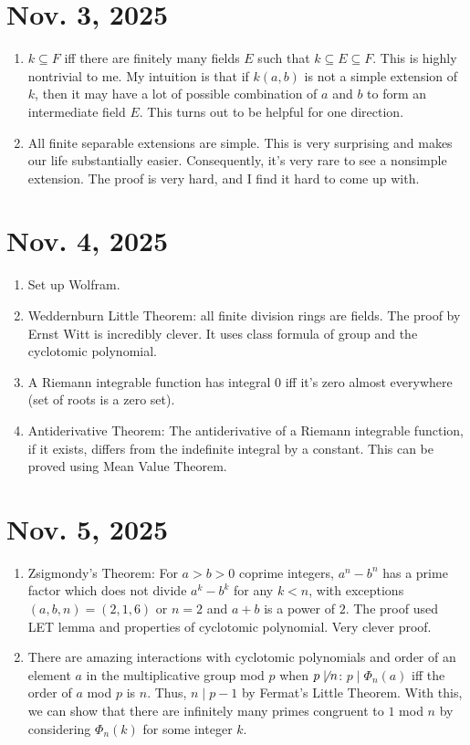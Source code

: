 \documentclass[15pt]{scrartcl}
\begin{document}
\section{Nov. 3, 2025}
\begin{enumerate}
\item $k\subseteq F$ iff there are finitely many fields $E$ such that $k\subseteq E\subseteq F$. 
This is highly nontrivial to me. My intuition is that if $k(a,b)$ is not a simple extension of $k$, then it may have a lot of possible combination of $a$ and $b$ to form an intermediate field $E$. This turns out to be helpful for one direction. 
\item All finite separable extensions are simple. This is very surprising and makes our life substantially easier. Consequently, it's very rare to see a nonsimple extension. The proof is very hard, and I find it hard to come up with. 
\end{enumerate}
\section{Nov. 4, 2025}
\begin{enumerate}
\item Set up Wolfram. 
\item Weddernburn Little Theorem: all finite division rings are fields. The proof by Ernst Witt is incredibly clever. It uses class formula of group and the cyclotomic polynomial.
\item A Riemann integrable function has integral $0$ iff it's zero almost everywhere (set of roots is a zero set).
\item Antiderivative Theorem: The antiderivative of a Riemann integrable function, if it exists, differs from the indefinite integral by a constant. This can be proved using Mean Value Theorem. 
\end{enumerate}
\section{Nov. 5, 2025}
\begin{enumerate}
\item Zsigmondy's Theorem: For $a>b>0$ coprime integers, $a^n-b^n$ has a prime factor which does not divide $a^k-b^k$ for any $k<n$, with exceptions $(a,b,n)=(2,1,6)$ or $n=2$ and $a+b$ is a power of $2$. The proof used LET lemma and properties of cyclotomic polynomial. Very clever proof.
\item There are amazing interactions with cyclotomic polynomials and order of an element $a$ in the multiplicative group mod $p$ when $p \not\mid n$: $p\mid \Phi_n(a)$ iff the order of $a$ mod $p$ is $n$. Thus, $n\mid p-1$ by Fermat's Little Theorem. With this, we can show that there are infinitely many primes congruent to $1$ mod $n$ by considering $\Phi_n(k)$ for some integer $k$.
\end{enumerate}
\end{document}
